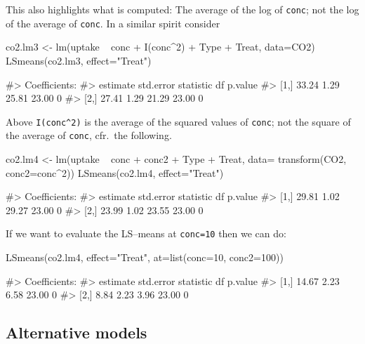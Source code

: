 This also highlights what is computed: The average of the log of
\texttt{conc}; not the log of the average of \texttt{conc}. In a similar
spirit consider

\begin{Schunk}
\begin{Sinput}
co2.lm3 <- lm(uptake ~ conc + I(conc^2) + Type + Treat, data=CO2)
LSmeans(co2.lm3, effect="Treat")
\end{Sinput}
\begin{Soutput}
#> Coefficients:
#>      estimate std.error statistic    df p.value
#> [1,]    33.24      1.29     25.81 23.00       0
#> [2,]    27.41      1.29     21.29 23.00       0
\end{Soutput}
\end{Schunk}

Above \verb'I(conc^2)' is the average of the squared values of
\texttt{conc}; not the square of the average of \texttt{conc}, cfr.~the
following.

\begin{Schunk}
\begin{Sinput}
co2.lm4 <- lm(uptake ~ conc + conc2 + Type + Treat, data=
              transform(CO2, conc2=conc^2))
LSmeans(co2.lm4, effect="Treat")
\end{Sinput}
\begin{Soutput}
#> Coefficients:
#>      estimate std.error statistic    df p.value
#> [1,]    29.81      1.02     29.27 23.00       0
#> [2,]    23.99      1.02     23.55 23.00       0
\end{Soutput}
\end{Schunk}

If we want to evaluate the LS--means at \texttt{conc=10} then we can do:

\begin{Schunk}
\begin{Sinput}
LSmeans(co2.lm4, effect="Treat", at=list(conc=10, conc2=100))
\end{Sinput}
\begin{Soutput}
#> Coefficients:
#>      estimate std.error statistic    df p.value
#> [1,]    14.67      2.23      6.58 23.00       0
#> [2,]     8.84      2.23      3.96 23.00       0
\end{Soutput}
\end{Schunk}

\hypertarget{alternative-models}{%
\subsection{Alternative models}\label{alternative-models}}

